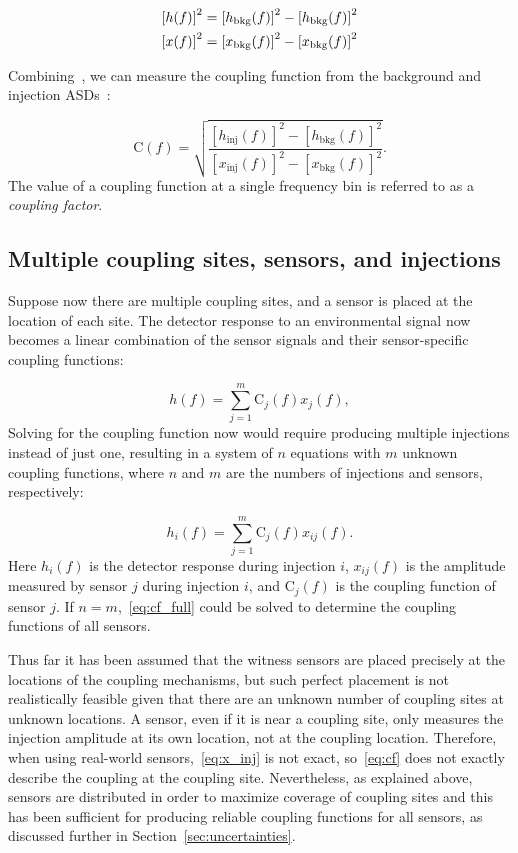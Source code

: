 \begin{align}
	\left[h(f)\right]^2 &= \left[h_{\textrm{bkg}}(f)\right]^2 - \left[h_{\textrm{bkg}}(f)\right]^2 \label{eq:h_inj}\\
	\left[x(f)\right]^2 &= \left[x_{\textrm{bkg}}(f)\right]^2 - \left[x_{\textrm{bkg}}(f)\right]^2 \label{eq:x_inj}
\end{align}

Combining~, we can measure the coupling function from the background and injection \acp{ASD}~\citep{Kruk_2016, pem_code}:

\begin{equation}\label{eq:cf}
	\mathrm{C}(f) = \sqrt{\frac{[h_{\textrm{inj}}(f)]^2 - [h_{\textrm{bkg}}(f)]^2}{[x_{\textrm{inj}}(f)]^2 - [x_{\textrm{bkg}}(f)]^2}}.
\end{equation}
The value of a coupling function at a single frequency bin is referred to as a \textit{coupling factor}.

\subsection{Multiple coupling sites, sensors, and injections}

Suppose now there are multiple coupling sites, and a sensor is placed at the location of each site.
The detector response to an environmental signal now becomes a linear combination of the sensor signals and their sensor-specific coupling functions:

\begin{equation}\label{eq:cf_model_expanded}
	h(f) = \sum_{j=1}^{m} \mathrm{C}_j(f) x_{j}(f),
\end{equation}
Solving for the coupling function now would require producing multiple injections instead of just one, resulting in a system of $n$ equations with $m$ unknown coupling functions, where $n$ and $m$ are the numbers of injections and sensors, respectively:

\begin{equation}\label{eq:cf_full}
	h_i(f) = \sum_{j=1}^{m} \mathrm{C}_j(f) x_{ij}(f).
\end{equation}
Here $h_i(f)$ is the detector response during injection $i$, $x_{ij}(f)$ is the amplitude measured by sensor $j$ during injection $i$, and $\mathrm{C}_j(f)$ is the coupling function of sensor $j$.
If $n = m$,~\cref{eq:cf_full} could be solved to determine the coupling functions of all sensors.

Thus far it has been assumed that the witness sensors are placed precisely at the locations of the coupling mechanisms, but such perfect placement is not realistically feasible given that there are an unknown number of coupling sites at unknown locations.
A sensor, even if it is near a coupling site, only measures the injection amplitude at its own location, not at the coupling location.
Therefore, when using real-world sensors,~\cref{eq:x_inj} is not exact, so~\cref{eq:cf} does not exactly describe the coupling at the coupling site.
Nevertheless, as explained above, sensors are distributed in order to maximize coverage of coupling sites and this has been sufficient for producing reliable coupling functions for all sensors, as discussed further in Section~\ref{sec:uncertainties}.

